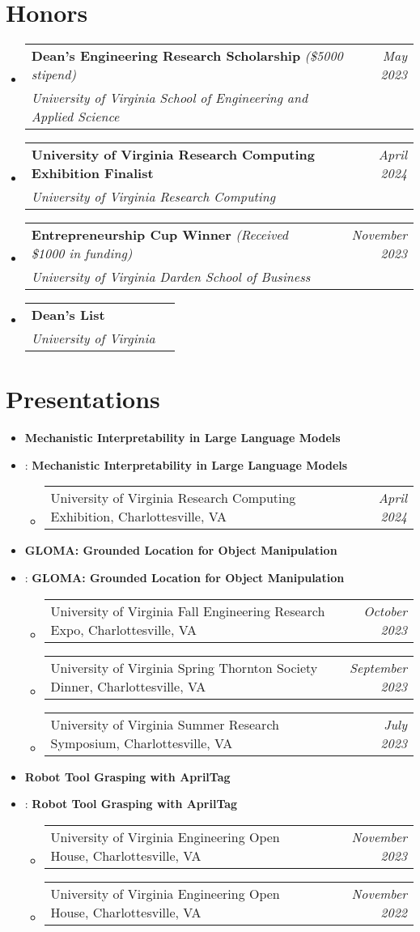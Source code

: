 \documentclass[letterpaper,11pt]{article}
\makeatletter
\newcommand{\resumeItem}[2]{
  \if\relax\detokenize{#1}\relax
    \item{#2 \vspace{-2pt}}
  \else
    \item{
      \textbf{#1}: #2 \vspace{-2pt}
    }
  \fi
}
\newcommand{\honoritem}[4]{
  \vspace{-1pt}\item
    \begin{tabular*}{0.97\textwidth}{l@{\extracolsep{\fill}}r}
      #1 & \textit{\small #2} \\
      \textit{\small#3} & \textit{\small #4} \\
    \end{tabular*}\vspace{-5pt}
}
\newcommand{\resumeSubHeadingListStart}{\begin{itemize}[leftmargin=*]}
\newcommand{\resumeSubHeadingListEnd}{\end{itemize}}
\newcommand{\resumeItemWithDate}[3]{
  \item
    \begin{tabular*}{#1\textwidth}{@{\extracolsep{\fill}} l r}
      #2 & \small\textit{#3} \\
    \end{tabular*}
}
\makeatother
\begin{document}

\section{Honors}
\resumeSubHeadingListStart
\honoritem
{\textbf{Dean's Engineering Research Scholarship} \textit{(\$5000 stipend)}}{\textit{May 2023}}
{University of Virginia School of Engineering and Applied Science}{}
\honoritem
{\textbf{University of Virginia Research Computing Exhibition Finalist}}{\textit{April 2024}}
{University of Virginia Research Computing}{}
\honoritem
{\textbf{Entrepreneurship Cup Winner} \textit{(Received \$1000 in funding)}}{\textit{November 2023}}
{University of Virginia Darden School of Business}{}
\honoritem
{\textbf{Dean's List}}{}{University of Virginia}{}
\resumeSubHeadingListEnd




\section{Presentations}
\resumeSubHeadingListStart
\resumeItem{}{\textbf{Mechanistic Interpretability in Large Language Models}}\vspace{-4pt}
\begin{itemize}
  \resumeItemWithDate{0.925}{University of Virginia Research Computing Exhibition, Charlottesville, VA}{April 2024}
\end{itemize}\vspace{-9pt}
\resumeItem{}{\textbf{GLOMA: Grounded Location for Object Manipulation}}\vspace{-4pt}
\begin{itemize}
  \resumeItemWithDate{0.925}{University of Virginia Fall Engineering Research Expo, Charlottesville, VA}{October 2023}
  \resumeItemWithDate{0.925}{University of Virginia Spring Thornton Society Dinner, Charlottesville, VA}{September 2023}
  \resumeItemWithDate{0.925}{University of Virginia Summer Research Symposium, Charlottesville, VA}{July 2023}
\end{itemize}\vspace{-9pt}
\resumeItem{}{\textbf{Robot Tool Grasping with AprilTag}}\vspace{-4pt}
\begin{itemize}
  \resumeItemWithDate{0.925}{University of Virginia Engineering Open House, Charlottesville, VA}{November 2023}
  \resumeItemWithDate{0.925}{University of Virginia Engineering Open House, Charlottesville, VA}{November 2022}
\end{itemize}\vspace{-9pt}
\resumeSubHeadingListEnd
\end{document}
